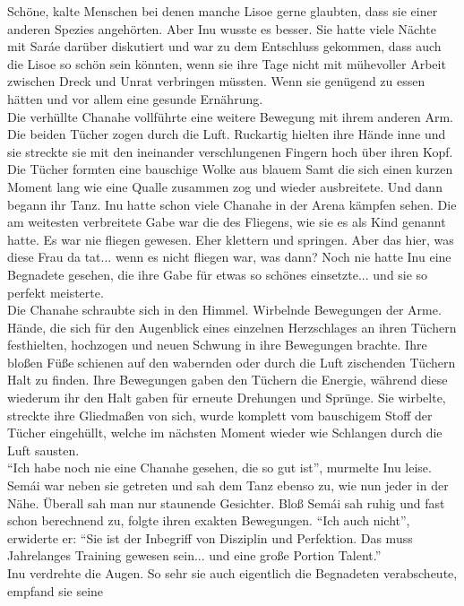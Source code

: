 Schöne, kalte Menschen bei denen manche Lisoe gerne glaubten, dass sie einer anderen Spezies 
angehörten. Aber Inu wusste es besser. Sie hatte viele Nächte mit Saráe darüber diskutiert und war 
zu dem Entschluss gekommen, dass auch die Lisoe so schön sein könnten, wenn sie ihre Tage nicht mit 
mühevoller Arbeit zwischen Dreck und Unrat verbringen müssten. Wenn sie genügend zu essen hätten 
und vor allem eine gesunde Ernährung. \\
Die verhüllte Chanahe vollführte eine weitere Bewegung mit ihrem anderen Arm. Die beiden Tücher 
zogen durch die Luft. Ruckartig hielten ihre Hände inne und sie streckte sie mit den ineinander 
verschlungenen Fingern hoch über ihren Kopf. Die Tücher formten eine bauschige Wolke aus blauem 
Samt die sich einen kurzen Moment lang wie eine Qualle zusammen zog und wieder ausbreitete. Und 
dann begann ihr Tanz. Inu hatte schon viele Chanahe in der Arena kämpfen sehen. Die am weitesten 
verbreitete Gabe war die des Fliegens, wie sie es als Kind genannt hatte. Es war nie fliegen 
gewesen. Eher klettern und springen. Aber das hier, was diese Frau da tat... wenn es nicht fliegen 
war, was dann? Noch nie hatte Inu eine Begnadete gesehen, die ihre Gabe für etwas so schönes 
einsetzte... und sie so perfekt meisterte. \\
Die Chanahe schraubte sich in den Himmel. Wirbelnde Bewegungen der Arme. Hände, die sich für den 
Augenblick eines einzelnen Herzschlages an ihren Tüchern festhielten, hochzogen und neuen Schwung 
in ihre Bewegungen brachte. Ihre bloßen Füße schienen auf den wabernden oder durch die Luft 
zischenden Tüchern Halt zu finden. Ihre Bewegungen gaben den Tüchern die Energie, während diese 
wiederum ihr den Halt gaben für erneute Drehungen und Sprünge. Sie wirbelte, streckte 
ihre Gliedmaßen von sich, wurde komplett vom bauschigem Stoff der Tücher eingehüllt, welche im 
nächsten Moment wieder wie Schlangen durch die Luft sausten.\\
``Ich habe noch nie eine Chanahe gesehen, die so gut ist'', murmelte Inu leise.\\
Semái war neben sie getreten und sah dem Tanz ebenso zu, wie nun jeder in der Nähe. Überall sah man 
nur staunende Gesichter. Bloß Semái sah ruhig und fast schon berechnend zu, folgte ihren exakten 
Bewegungen. ``Ich auch nicht'', erwiderte er: ``Sie ist der Inbegriff von Disziplin und Perfektion. 
Das muss Jahrelanges Training gewesen sein... und eine große Portion Talent.''\\
Inu verdrehte die Augen. So sehr sie auch eigentlich die Begnadeten verabscheute, empfand sie seine 
